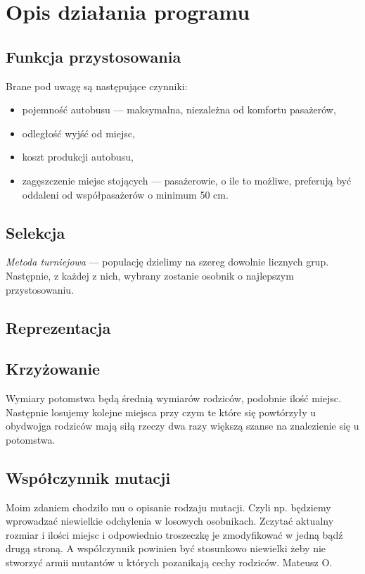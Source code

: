 \documentclass[10pt,a4paper]{article}
\begin{document}
\section{Opis działania programu}


\subsection{Funkcja przystosowania}
Brane pod uwagę są następujące czynniki:
\begin{itemize}
    \item pojemność autobusu --- maksymalna, niezależna od komfortu pasażerów,
    \item odległość wyjść od miejsc,
    \item koszt produkcji autobusu,
    \item zagęszczenie miejsc stojących --- pasażerowie, o ile to możliwe,
      preferują być oddaleni od współpasażerów o minimum 50 cm.
\end{itemize}


\subsection{Selekcja}
\emph{Metoda turniejowa} --- populację dzielimy na szereg dowolnie licznych
grup. Następnie, z każdej z nich, wybrany zostanie osobnik o najlepszym
przystosowaniu.


\subsection{Reprezentacja} 


\subsection{Krzyżowanie}
Wymiary potomstwa będą średnią wymiarów rodziców, podobnie ilość miejsc.
Następnie losujemy kolejne miejsca przy czym te które się powtórzyły u obydwojga
rodziców mają siłą rzeczy dwa razy większą szanse na znalezienie się u
potomstwa.

\subsection{Współczynnik mutacji}
Moim zdaniem chodziło mu o opisanie rodzaju mutacji. Czyli np. będziemy
wprowadzać niewielkie odchylenia w losowych osobnikach. Zczytać aktualny
rozmiar i ilości miejsc i odpowiednio troszeczkę je zmodyfikować w jedną bądź
drugą stroną.  A współczynnik powinien być stosunkowo niewielki żeby nie
stworzyć armii mutantów u których pozanikają cechy rodziców. Mateusz O. 
\end{document}
